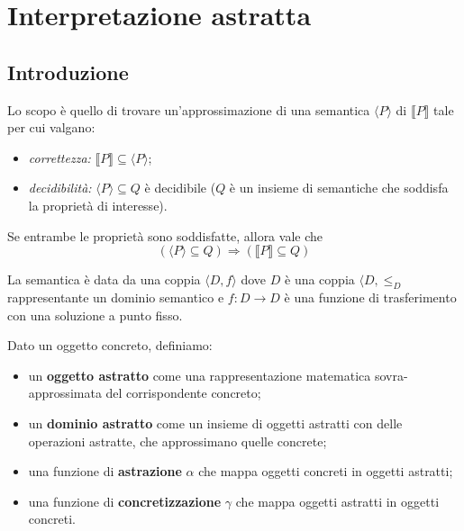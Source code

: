 \documentclass[a4paper, 10pt]{book}
\begin{document}
	\begin{frontespizio}
		\Preambolo{\usepackage{datetime}}
		\Scuola{}
	\end{frontespizio}
	
	\tableofcontents
	\newpage


	
	\chapter{Interpretazione astratta}
	\section{Introduzione}
	Lo scopo è quello di trovare un'approssimazione di una semantica $\langle P \rangle$ di $\llbracket P \rrbracket$ tale per cui valgano:
	\begin{itemize}
		\item \textit{correttezza:} $\llbracket P \rrbracket \subseteq \langle P \rangle$;
		\item \textit{decidibilità:} $\langle P \rangle \subseteq Q$ è decidibile ($Q$ è un insieme di semantiche che soddisfa la proprietà di interesse).
	\end{itemize}

	Se entrambe le proprietà sono soddisfatte, allora vale che \[ (\langle P \rangle \subseteq Q) \Rightarrow (\llbracket P \rrbracket \subseteq Q) \]
	
	La semantica è data da una coppia $\langle D, f \rangle$ dove $D$ è una coppia $\langle D, \leq_D$ rappresentante un dominio semantico e $f: D \to D$ è una funzione di trasferimento con una soluzione a punto fisso.
	
	Dato un oggetto concreto, definiamo:
	\begin{itemize}
		\item un \textbf{oggetto astratto} come una rappresentazione matematica sovra-approssimata del corrispondente concreto;
		\item un \textbf{dominio astratto} come un insieme di oggetti astratti con delle operazioni astratte, che approssimano quelle concrete;
		\item una funzione di \textbf{astrazione} $\alpha$ che mappa oggetti concreti in oggetti astratti;
		\item una funzione di \textbf{concretizzazione} $\gamma$ che mappa oggetti astratti in oggetti concreti.
	\end{itemize}
	
\end{document}
